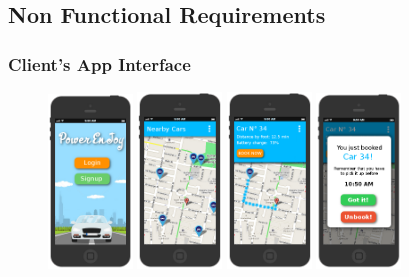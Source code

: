 \documentclass[11pt]{article} %
\begin{document}
\subsection{Non Functional Requirements}

\subsubsection{Client's App Interface}
\begin{figure}[H]
	\includegraphics[width=0.2\textwidth]{mockup/1Login.png}
	\includegraphics[width=0.2\textwidth]{mockup/2MainClient.png}
	\includegraphics[width=0.2\textwidth]{mockup/3CarSelected.png}
	\includegraphics[width=0.2\textwidth]{mockup/4CarBooked.png}

\end{figure}
\end{document}
